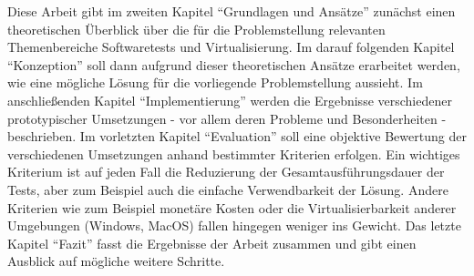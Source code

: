 Diese Arbeit gibt im zweiten Kapitel "`Grundlagen und Ansätze"' zunächst einen theoretischen Überblick über die für die Problemstellung relevanten Themenbereiche Softwaretests und Virtualisierung. Im darauf folgenden Kapitel "`Konzeption"' soll dann aufgrund dieser theoretischen Ansätze erarbeitet werden, wie eine mögliche Lösung für die vorliegende Problemstellung aussieht. Im anschließenden Kapitel "`Implementierung"' werden die Ergebnisse verschiedener prototypischer Umsetzungen - vor allem deren Probleme und Besonderheiten - beschrieben. Im vorletzten Kapitel "`Evaluation"' soll eine objektive Bewertung der verschiedenen Umsetzungen anhand bestimmter Kriterien erfolgen. Ein wichtiges Kriterium ist auf jeden Fall die Reduzierung der Gesamtausführungsdauer der Tests, aber zum Beispiel auch die einfache Verwendbarkeit der Lösung. Andere Kriterien wie zum Beispiel monetäre Kosten oder die Virtualisierbarkeit anderer Umgebungen (Windows, MacOS) fallen hingegen weniger ins Gewicht. Das letzte Kapitel "`Fazit"' fasst die Ergebnisse der Arbeit zusammen und gibt einen Ausblick auf mögliche weitere Schritte.

